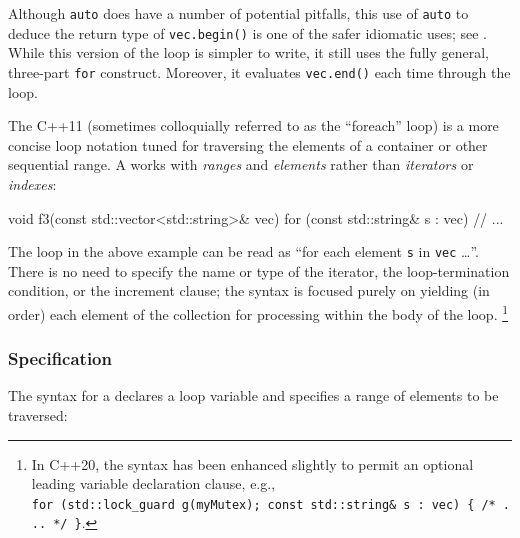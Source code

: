 \noindent Although \lstinline!auto! does have a number of potential pitfalls, this
use of \lstinline!auto! to deduce the return type of \lstinline!vec.begin()!
is one of the safer idiomatic uses; see . While this
version of the loop is simpler to write, it still uses the fully
general, three-part \lstinline!for! construct. Moreover, it evaluates
\lstinline!vec.end()! each time through the loop.

The C++11  (sometimes colloquially
referred to as the ``foreach'' loop) is a more concise loop notation
tuned for traversing the elements of a container or other sequential
range. A  works with \emph{ranges}
and \emph{elements} rather than \emph{iterators} or \emph{indexes}:

\begin{emcppslisting}[emcppsbatch=e1,label={iterating-over-std::vector-with-a-range-based-for-loop}]
void f3(const std::vector<std::string>& vec)
{
    for (const std::string& s : vec)
    {
        // ...
    }
}
\end{emcppslisting}
    

\noindent The loop in the above example can be read as ``for each element
\lstinline!s! in \lstinline!vec! \ldots''. There is no need to specify the
name or type of the iterator, the loop-termination condition, or the
increment clause; the syntax is focused purely on yielding (in order)
each element of the collection for processing within the body of the
loop. {\cprotect\footnote{In C++20, the syntax has been enhanced
slightly to permit an optional leading variable declaration clause,
e.g.,
  \lstinline!for!~\lstinline!(std::lock_guard!~\lstinline!g(myMutex);!~\lstinline!const!~\lstinline!std::string&!~\lstinline!s!~\lstinline!:!~\lstinline!vec)!~\lstinline!{!~\lstinline!/*!~\lstinline!...!~\lstinline!*/!~\lstinline!}!.}}

\subsubsection[Specification]{Specification}\label{specification}

The syntax for a  declares a loop
variable and specifies a range of elements to be traversed:


